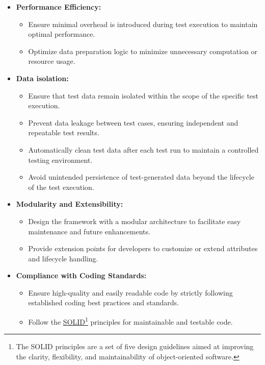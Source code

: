 \begin{itemize}
	\item \textbf{Performance Efficiency:}
	      \begin{itemize}
		      \item Ensure minimal overhead is introduced during test execution to maintain optimal performance.
		      \item Optimize data preparation logic to minimize unnecessary computation or resource usage.
	      \end{itemize}
    \item \textbf{Data isolation:}
        \begin{itemize}
            \item Ensure that test data remain isolated within the scope of the specific test execution.
            \item Prevent data leakage between test cases, ensuring independent and repeatable test results.
            \item Automatically clean test data after each test run to maintain a controlled testing environment.
            \item Avoid unintended persistence of test-generated data beyond the lifecycle of the test execution.
        \end{itemize}
	\item \textbf{Modularity and Extensibility:}
  	      \begin{itemize}
		      \item Design the framework with a modular architecture to facilitate easy maintenance and future enhancements.
		      \item Provide extension points for developers to customize or extend attributes and lifecycle handling.
	      \end{itemize}

	\item \textbf{Compliance with Coding Standards:}
	      \begin{itemize}
		      \item Ensure high-quality and easily readable code by strictly following established coding best practices and standards.
		      \item Follow the \href{https://en.wikipedia.org/wiki/SOLID}{SOLID}\footnote{The SOLID principles are a set of five design guidelines aimed at improving the clarity, flexibility, and maintainability of object-oriented software.} principles for maintainable and testable code.
	      \end{itemize}


\end{itemize}
